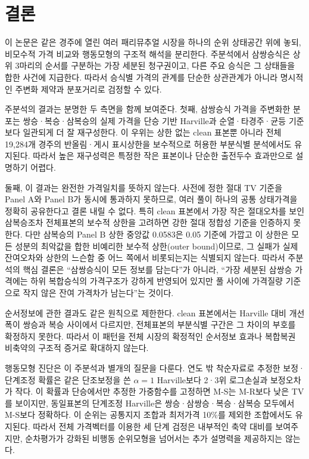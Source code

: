 \section{결론}

이 논문은 같은 경주에 열린 여러 패리뮤추얼 시장을 하나의 순위 상태공간 위에
놓되, 비모수적 가격 비교와 행동모형의 구조적 해석을 분리한다. 주분석에서
삼쌍승식은 상위 3마리의 순서를 구분하는 가장 세분된 청구권이고, 다른 주요
승식은 그 상태들을 합한 사건에 지급한다. 따라서 승식별 가격의 관계를 단순한
상관관계가 아니라 명시적인 주변화 제약과 분포거리로 검정할 수 있다.

주분석의 결과는 분명한 두 측면을 함께 보여준다. 첫째, 삼쌍승식 가격을
주변화한 분포는 쌍승·복승·삼복승의 실제 가격을 단승 기반 Harville과
순열·타경주·균등 기준보다 일관되게 더 잘 재구성한다. 이 우위는 상한 없는
clean 표본뿐 아니라 전체 19,284개 경주의 반올림·게시 표시상한을 보수적으로
허용한 부분식별 분석에서도 유지된다. 따라서 높은 재구성력은 특정한 작은
표본이나 단순한 출전두수 효과만으로 설명하기 어렵다.

둘째, 이 결과는 완전한 가격일치를 뜻하지 않는다. 사전에 정한 절대 TV 기준을
Panel A와 Panel B가 동시에 통과하지 못하므로, 여러 풀이 하나의 공통
상태가격을 정확히 공유한다고 결론 내릴 수 없다. 특히 clean 표본에서 가장
작은 절대오차를 보인 삼복승조차 전체표본의 보수적 상한을 고려하면 강한
절대 정합성 기준을 인증하지 못한다. 다만 삼복승의 Panel B 상한 중앙값
0.0583은 0.05 기준에 가깝고 이 상한은 모든 성분의 최악값을 합한 비예리한
보수적 상한(outer bound)이므로, 그 실패가
실제 잔여오차와 상한의 느슨함 중 어느 쪽에서 비롯되는지는 식별되지 않는다.
따라서 주분석의 핵심 결론은 ``삼쌍승식이
모든 정보를 담는다''가 아니라, ``가장 세분된 삼쌍승 가격에는 하위 복합승식의
가격구조가 강하게 반영되어 있지만 풀 사이에 가격질량 기준으로 작지 않은 잔여
가격차가 남는다''는 것이다.

순서정보에 관한 결과도 같은 원칙으로 제한한다. clean 표본에서는 Harville
대비 개선폭이 쌍승과 복승 사이에서 다르지만, 전체표본의 부분식별 구간은 그
차이의 부호를 확정하지 못한다. 따라서 이 패턴을 전체 시장의 확정적인
순서정보 효과나 복합복권 비축약의 구조적 증거로 확대하지 않는다.

행동모형 진단은 이 주분석과 별개의 질문을 다룬다. 연도 밖 착순자료로 추정한
보정·단계조정 확률은 같은 단조보정을 쓴 $\alpha=1$ Harville보다 2·3위
로그손실과 보정오차가 작다. 이 확률과
단승에서만 추정한 가중함수를 고정하면 M-S는 M-R보다 낮은 TV를 보이지만,
동일표본의 단계조정 Harville은 쌍승·삼쌍승·복승·삼복승 모두에서 M-S보다
정확하다. 이 순위는 공통지지 조합과 최저가격 10\%를 제외한 조합에서도
유지된다. 따라서 전체 가격벡터를 이용한 세 단계 검정은 내부적인 축약 대비를
보여주지만, 순차평가가 강화된 비행동 순위모형을 넘어서는 추가 설명력을
제공하지는 않는다.

